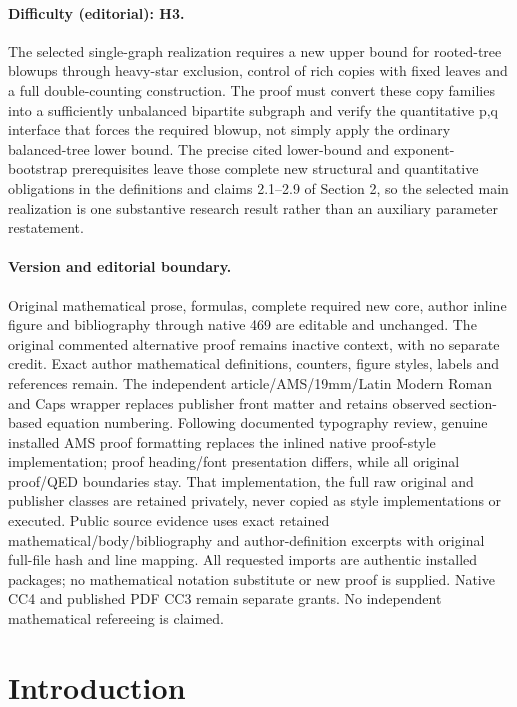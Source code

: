 \documentclass[11pt]{article}
\numberwithin{equation}{section}
\theoremstyle{definition}
\begin{document}
\paragraph{Difficulty (editorial): H3.} The selected single-graph realization requires a new upper bound for rooted-tree blowups through heavy-star exclusion, control of rich copies with fixed leaves and a full double-counting construction. The proof must convert these copy families into a sufficiently unbalanced bipartite subgraph and verify the quantitative p,q interface that forces the required blowup, not simply apply the ordinary balanced-tree lower bound. The precise cited lower-bound and exponent-bootstrap prerequisites leave those complete new structural and quantitative obligations in the definitions and claims 2.1–2.9 of Section 2, so the selected main realization is one substantive research result rather than an auxiliary parameter restatement.
\paragraph{Version and editorial boundary.} Original mathematical prose, formulas, complete required new core, author inline figure and bibliography through native 469 are editable and unchanged. The original commented alternative proof remains inactive context, with no separate credit. Exact author mathematical definitions, counters, figure styles, labels and references remain. The independent article/AMS/19mm/Latin Modern Roman and Caps wrapper replaces publisher front matter and retains observed section-based equation numbering. Following documented typography review, genuine installed AMS proof formatting replaces the inlined native proof-style implementation; proof heading/font presentation differs, while all original proof/QED boundaries stay. That implementation, the full raw original and publisher classes are retained privately, never copied as style implementations or executed. Public source evidence uses exact retained mathematical/body/bibliography and author-definition excerpts with original full-file hash and line mapping. All requested imports are authentic installed packages; no mathematical notation substitute or new proof is supplied. Native CC4 and published PDF CC3 remain separate grants. No independent mathematical refereeing is claimed.
\clearpage
\section{Introduction}
\end{document}
